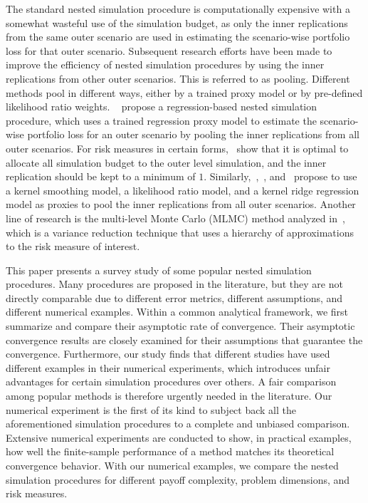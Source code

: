 The standard nested simulation procedure is computationally expensive with a somewhat wasteful use of the simulation budget, as only the inner replications from the same outer scenario are used in estimating the scenario-wise portfolio loss for that outer scenario. 
Subsequent research efforts have been made to improve the efficiency of nested simulation procedures by using the inner replications from other outer scenarios. 
This is referred to as pooling. 
Different methods pool in different ways, either by a trained proxy model or by pre-defined likelihood ratio weights.
~\cite{broadie2015risk} propose a regression-based nested simulation procedure, which uses a trained regression proxy model to estimate the scenario-wise portfolio loss for an outer scenario by pooling the inner replications from all outer scenarios.
For risk measures in certain forms,~\cite{broadie2015risk} show that it is optimal to allocate all simulation budget to the outer level simulation, and the inner replication should be kept to a minimum of $1$.
Similarly,~\cite{hong2017kernel},~\cite{feng2020optimal}, and~\cite{zhang2022sample} propose to use a kernel smoothing model, a likelihood ratio model, and a kernel ridge regression model as proxies to pool the inner replications from all outer scenarios.
Another line of research is the multi-level Monte Carlo (MLMC) method analyzed in~\cite{giles2019multilevel}, which is a variance reduction technique that uses a hierarchy of approximations to the risk measure of interest.

This paper presents a survey study of some popular nested simulation procedures. 
Many procedures are proposed in the literature, but they are not directly comparable due to different error metrics, different assumptions, and different numerical examples.
Within a common analytical framework, we first summarize and compare their asymptotic rate of convergence.
Their asymptotic convergence results are closely examined for their assumptions that guarantee the convergence.
Furthermore, our study finds that different studies have used different examples in their numerical experiments, which introduces unfair advantages for certain simulation procedures over others. 
A fair comparison among popular methods is therefore urgently needed in the literature. 
Our numerical experiment is the first of its kind to subject back all the aforementioned simulation procedures to a complete and unbiased comparison. 
Extensive numerical experiments are conducted to show, in practical examples, how well the finite-sample performance of a method matches its theoretical convergence behavior. 
With our numerical examples, we compare the nested simulation procedures for different payoff complexity, problem dimensions, and risk measures. 

